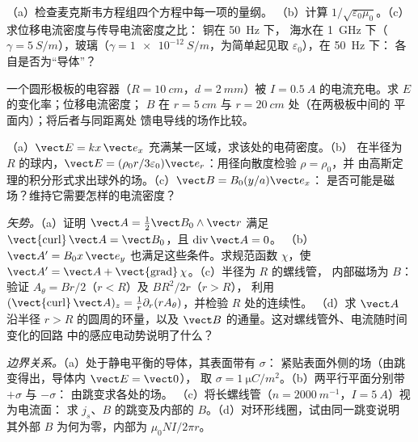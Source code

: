 \begin{exercise}[$\star$]\label{exo:b2:maxwell-equations:2}
（a）检查麦克斯韦方程组四个方程中每一项的量纲。
（b）计算 $1/\sqrt{\varepsilon_0\mu_0}$。（c）求位移电流密度与传导电流密度之比：
铜在 \qty{50}{Hz} 下，
海水在 \qty{1}{GHz} 下（$\gamma = \qty{5}{S/m}$），玻璃（$\gamma =
\qty{1e-12}{S/m}$，为简单起见取 $\varepsilon_0$），在 \qty{50}{Hz} 下：
各自是否为“导体”？
\end{exercise}

\begin{exercise}[$\star$]\label{exo:b2:maxwell-equations:3}
一个圆形极板的电容器（$R = \qty{10}{cm}$，$d = \qty{2}{mm}$）被
$I = \qty{0.5}{A}$ 的电流充电。求 $E$ 的变化率；位移电流密度；
$B$ 在 $r = \qty{5}{cm}$ 与 $r = \qty{20}{cm}$ 处（在两极板中间的
平面内）；将后者与同距离处
馈电导线的场作比较。
\end{exercise}

\begin{exercise}[$\star$]\label{exo:b2:maxwell-equations:4}
（a）$\vect E = kx\,\vect e_x$ 充满某一区域，求该处的电荷密度。（b）
在半径为 $R$ 的球内，$\vect E = (\rho_0r/3\varepsilon_0)\vect e_r$：用径向散度检验
$\rho = \rho_0$，并
由高斯定理的积分形式求出球外的场。（c）$\vect B = B_0(y/a)\vect e_x$：
是否可能是磁场？维持它需要怎样的电流密度？
\end{exercise}

\begin{exercise}[$\star\star$]\label{exo:b2:maxwell-equations:5}
\emph{矢势。}（a）证明 $\vect A = \tfrac12\vect B_0\wedge\vect r$
满足 $\operatorname{\vect{curl}}\vect A = \vect B_0$，且 $\operatorname{div}\vect A = 0$。
（b）$\vect A' = B_0x\,\vect e_y$ 也满足这些条件。求规范函数 $\chi$，使
$\vect A' = \vect A + \operatorname{\vect{grad}}\chi$。（c）半径为 $R$ 的螺线管，
内部磁场为 $B$：验证 $A_\theta = Br/2$（$r < R$）及 $BR^2/2r$（$r > R$），
利用 $(\operatorname{\vect{curl}}\vect A)_z = \frac1r\partial_r(rA_\theta)$，并检验 $R$ 处的连续性。
（d）求 $\vect A$ 沿半径 $r > R$ 的圆周的环量，以及
$\vect B$ 的通量。这对螺线管外、电流随时间变化的回路
中的感应电动势说明了什么？
\end{exercise}

\begin{exercise}[$\star\star$]\label{exo:b2:maxwell-equations:6}
\emph{边界关系。}（a）处于静电平衡的导体，其表面带有 $\sigma$：
紧贴表面外侧的场（由跳变得出，导体内 $\vect E = \vect 0$），
取 $\sigma = \qty{1}{\micro C/m^2}$。（b）两平行平面分别带 $+\sigma$ 与 $-\sigma$：
由跳变求各处的场。
（c）将长螺线管（$n = \qty{2000}{m^{-1}}$，$I = \qty{5}{A}$）视为电流面：
求 $j_s$、$B$ 的跳变及内部的 $B$。（d）对环形线圈，试由同一跳变说明
其外部 $B$ 为何为零，内部为 $\mu_0NI/2\pi r$。
\end{exercise}

